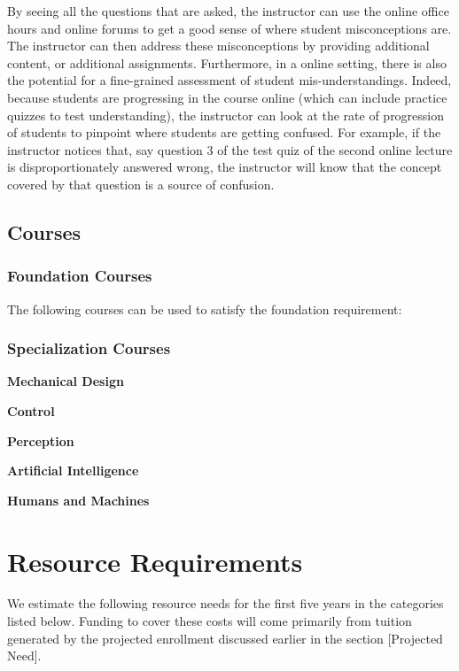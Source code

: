 \documentclass[11pt,letterpaper]{article}
\begin{document}
By seeing all the questions that are asked, the instructor can use the
online office hours and online forums to get a good sense of where
student misconceptions are. The instructor can then address these
misconceptions by providing additional content, or additional
assignments. Furthermore, in a online setting, there is also the
potential for a fine-grained assessment of student mis-understandings.
Indeed, because students are progressing in the course online (which
can include practice quizzes to test understanding), the instructor
can look at the rate of progression of students to pinpoint where
students are getting confused. For example, if the instructor notices
that, say question 3 of the test quiz of the second online lecture is
disproportionately answered wrong, the instructor will know that the
concept covered by that question is a source of confusion.

\subsection{Courses}
\label{Sec:ExistingCourses}

\subsubsection{Foundation Courses}
\label{FoundationCourses}

The following courses can be used to satisfy the foundation
requirement:

\subsubsection{Specialization Courses}
\label{SpecializationCourses}

{\bf Mechanical Design}


{\bf Control}


{\bf Perception}


{\bf Artificial Intelligence}

  
{\bf Humans and Machines}


\section{Resource Requirements}
\label{Sec:ResourceRequirements}

We estimate the following resource needs for the first five years in
the categories listed below. Funding to cover these costs will come
primarily from tuition generated by the projected enrollment discussed
earlier in the section [Projected Need].
\end{document}
